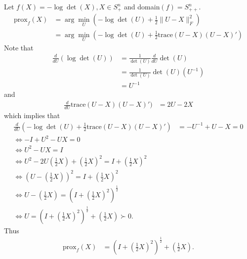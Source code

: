 \documentclass[12pt, leqno]{article}
\providecommand{\norm}[1]{\lVert#1\rVert}
\newcommand{\prox}{\mathrm{prox}}
\newcommand{\trace}{\mathrm{trace}}
\begin{document}
Let $f(X) = -\log \det(X), X \in S_{+}^n$ and domain$(f) =
S_{++}^n$.
\begin{align*}
\prox_f(X) &= \arg\min_{U}(-\log \det(U) + \frac{1}{2}\norm{U-X}_F^2)
  \\
&= \arg\min_{U}(-\log \det(U) + \frac{1}{2}\trace(U-X)(U-X)') 
\end{align*}
Note that
\begin{align*}
\frac{d}{dU} (\log \det(U)) &=  \frac{1}{\det(U)} \frac{d}{dU} \det(U)
\\
&=  \frac{1}{\det(U)} \det(U) (U^{-1}) \\
&=  U^{-1}
\end{align*}
and
\begin{align*}
\frac{d}{dU} \trace(U-X)(U-X)') &= 2U - 2X
\end{align*}
which implies that
\begin{align*}
\frac{d}{dU} (-\log \det(U) + \frac{1}{2}\trace(U-X)(U-X)') &=
                                                              -U^{-1}
                                                              + U -
                                                              X  =
                                                              0\\
\iff -I + U^2 - UX = 0 \\
\iff   U^2 - UX = I \\
\iff   U^2 - 2U(\frac{1}{2}X) +(\frac{1}{2}X)^2 = I +(\frac{1}{2}X)^2
  \\
\iff   (U -(\frac{1}{2}X))^2 = I +(\frac{1}{2}X)^2 \\
\iff   U -(\frac{1}{2}X) = (I +(\frac{1}{2}X)^2)^{\frac{1}{2}} \\
\iff   U = (I +(\frac{1}{2}X)^2)^{\frac{1}{2}}  + (\frac{1}{2}X) \succ 0.
\end{align*}
Thus
\begin{align*}
\prox_f(X) &= (I +(\frac{1}{2}X)^2)^{\frac{1}{2}}  + (\frac{1}{2}X).
\end{align*}
\end{document}
